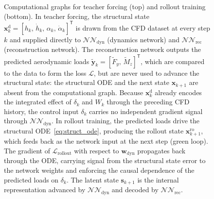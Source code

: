 \begin{figure}[tb]
\caption{Computational graphs for teacher forcing (top) and rollout training (bottom).
In teacher forcing, the structural state
$\mathbf{x}_k^\mathrm{d} = [h_k,\,\dot{h}_k,\,\alpha_k,\,\dot{\alpha}_k]^\mathsf{T}$
is drawn from the CFD dataset at every step $k$ and supplied directly to
$\mathcal{NN}_\mathrm{dyn}$ (dynamics network) and $\mathcal{NN}_\mathrm{rec}$
(reconstruction network). The reconstruction network outputs the predicted
aerodynamic loads $\tilde{\mathbf{y}}_k = [\tilde{F}_y,\,\tilde{M}_z]^\mathsf{T}$,
which are compared to the data to form the loss $\mathcal{L}$, but are never used
to advance the structural state: the structural ODE and the next state
$\mathbf{x}_{k+1}$ are absent from the computational graph. Because
$\mathbf{x}_k^\mathrm{d}$ already encodes the integrated effect of $\delta_k$ and
$W_k$ through the preceding CFD history, the control input $\delta_k$ carries no
independent gradient signal through $\mathcal{NN}_\mathrm{dyn}$.
In rollout training, the predicted loads drive the structural ODE~\eqref{eq:struct_ode},
producing the rollout state $\mathbf{x}_{k+1}^\mathrm{ro}$, which feeds back as the
network input at the next step (green loop). The gradient of $\mathcal{L}_\mathrm{rollout}$ with respect to $\mathbf{w}_\mathrm{dyn}$
propagates back through the ODE, carrying signal from the structural state error to the
network weights and enforcing the causal dependence of the predicted loads on $\delta_k$.
The latent state $\mathbf{s}_{k+1}$ is the internal representation advanced by
$\mathcal{NN}_\mathrm{dyn}$ and decoded by $\mathcal{NN}_\mathrm{rec}$.}
\label{fig:tf_vs_rollout}
\end{figure}

